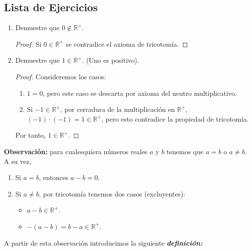 \documentclass[11pt]{article}
\newcommand{\R}{\mathbb{R}}
\newcommand{\bfit}[1]{\textbf{\textit{#1}}}
\begin{document}
\subsection*{Lista de Ejercicios}
\begin{enumerate}[label=\alph*)]
    \item Demuestre que $0\notin \R^+$.
    \vspace{-1em}\begin{proof} 
    Si $0\in \R^+$ se contradice el axioma de tricotomía.
    \end{proof} \vspace{-1em}

    \item Demuestre que $1\in \R^+$. (Uno es positivo).
    \vspace{-1em}\begin{proof} Consideremos los casos: \begin{enumerate}[label=\roman*)]
    \item $1=0$, pero este caso se descarta por axioma del neutro multiplicativo.
    \item Si $-1\in \R^+$, por cerradura de la multiplicación en $\R^+$, $(-1) \cdot (-1)=1\in \R^+$, pero esto contradice la propiedad de tricotomía.
    \end{enumerate} Por tanto, $1\in \R^+$.
    \end{proof} \vspace{-1em}
\end{enumerate}

\textbf{Observación:} para cualesquiera números reales $a$ y $b$ tenemos que $a=b$ o $a\neq b$. A su vez, \vspace{-1em}\begin{enumerate}[label=\roman*)]
\item Si $a=b$, entonces $a-b=0$.
\item Si $a\neq b$, por tricotomía tenemos dos casos (excluyentes):\begin{itemize}
    \item $a-b\in \R^+$.%
    \item $-(a-b)=b-a\in \R^+$.%
\end{itemize}%
\end{enumerate}\vspace{-1em}

A partir de esta observación introducimos la siguiente \bfit{definición:}
\end{document}
